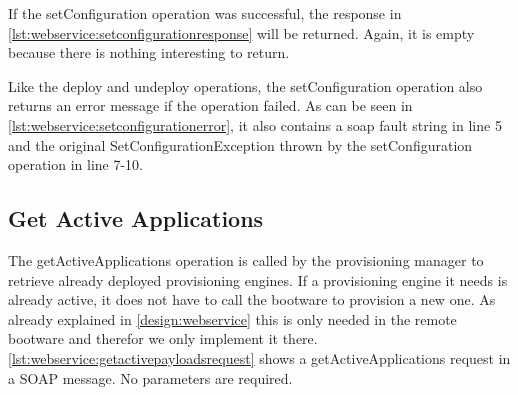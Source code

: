 If the setConfiguration operation was successful, the response in \autoref{lst:webservice:setconfigurationresponse} will be returned.
Again, it is empty because there is nothing interesting to return.

\vspace*{\baselineskip}

Like the deploy and undeploy operations, the setConfiguration operation also returns an error message if the operation failed.
As can be seen in \autoref{lst:webservice:setconfigurationerror}, it also contains a soap fault string in line 5 and the original SetConfigurationException thrown by the setConfiguration operation in line 7-10.

\vspace*{\baselineskip}

\subsection{Get Active Applications}

The getActiveApplications operation is called by the provisioning manager to retrieve already deployed provisioning engines.
If a provisioning engine it needs is already active, it does not have to call the bootware to provision a new one.
As already explained in \autoref{design:webservice} this is only needed in the remote bootware and therefor we only implement it there.
\autoref{lst:webservice:getactivepayloadsrequest} shows a getActiveApplications request in a SOAP message.
No parameters are required.

\vspace*{\baselineskip}

